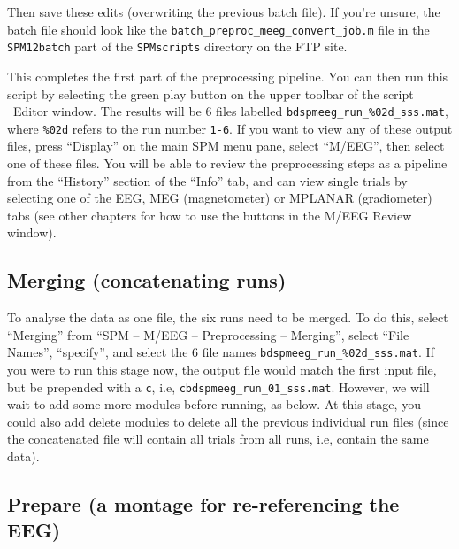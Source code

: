 Then save these edits (overwriting the previous batch file). If you're unsure, the batch file should look like the \texttt{batch\_preproc\_meeg\_convert\_job.m} file in the \texttt{SPM12batch} part of the \texttt{SPMscripts} directory on the FTP site. 

This completes the first part of the preprocessing pipeline. You can then run this script by selecting the green play button on the upper toolbar of the script \matlab\ Editor window. The results will be 6 files labelled \texttt{bdspmeeg\_run\_\%02d\_sss.mat}, where \texttt{\%02d} refers to the run number \verb|1-6|. If you want to view any of these output files, press ``Display'' on the main SPM menu pane, select ``M/EEG'', then select one of these files. You will be able to review the preprocessing steps as a pipeline from the ``History'' section of the ``Info'' tab, and can view single trials by selecting one of the EEG, MEG (magnetometer) or MPLANAR (gradiometer) tabs (see other chapters for how to use the buttons in the M/EEG Review window).

\subsection{Merging (concatenating runs)}

To analyse the data as one file, the six runs need to be merged. To do this, select ``Merging'' from ``SPM -- M/EEG -- Preprocessing -- Merging'', select ``File Names'', ``specify'', and select the 6 file names \texttt{bdspmeeg\_run\_\%02d\_sss.mat}. If you were to run this stage now, the output file would match the first input file, but be prepended with a \texttt{c}, i.e, \texttt{cbdspmeeg\_run\_01\_sss.mat}. However, we will wait to add some more modules before running, as below. At this stage, you could also add delete modules to delete all the previous individual run files (since the concatenated file will contain all trials from all runs, i.e, contain the same data).

\subsection{Prepare (a montage for re-referencing the EEG)}

